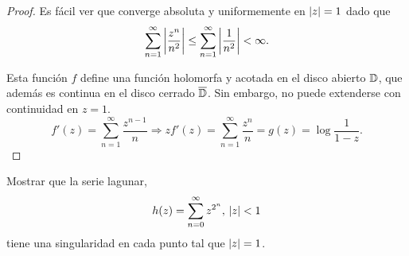 \begin{proof}
    Es fácil ver que converge absoluta y uniformemente en $\left\lvert z\right\rvert = 1$ dado que
    \begin{equation*}
        \sum_{n=1}^{\infty} \left\lvert\frac{z^n}{n^2}\right\rvert \leq \sum_{n=1}^{\infty} \left\lvert\frac{1}{n^2}\right\rvert < \infty.
    \end{equation*}

    Esta función $f$ define una función holomorfa y acotada en el disco abierto $\mathbb{D}$, que además es continua en el disco cerrado $\overline{\mathbb{D}}$. Sin embargo, no puede extenderse con continuidad en $z = 1$.
    \begin{equation*}
        f'(z) =  \sum_{n=1}^{\infty} \frac{z^{n-1}}{n} \Rightarrow zf'(z) = \sum_{n=1}^{\infty} \frac{z^{n}}{n} = g(z) = \log{\frac{1}{1 - z}}.
    \end{equation*}

    \begin{comment}
    \begin{equation*}
        f''(z) =  \sum_{n=2}^{\infty} \frac{(n - 1)}{n} z^{n-2} =  \sum_{n=2}^{\infty} z^{n-2} - \sum_{n=2}^{\infty} \frac{1}{n} z^{n-2}
    \end{equation*}
     \begin{equation*}
         \sum_{n=2}^{\infty} z^{n-2} = \sum_{n=0}^{\infty} z^{n} = \frac{1}{1 - z}.
    \end{equation*}
    \end{comment}

 \end{proof}


\begin{example}
    Mostrar que la serie lagunar,
    \begin{equation*}
        h(z) = \sum_{n=0}^{\infty}  z^{2^n}, \, \left\lvert z\right\rvert < 1
    \end{equation*}
 tiene una singularidad en cada punto tal que $\left\lvert z\right\rvert = 1$.
\end{example}

